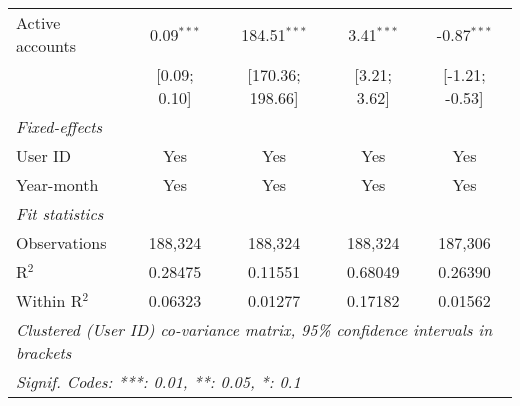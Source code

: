 \begin{table}[htbp]
\begin{threeparttable}[b]
\begin{tabular}{lcccc}
         Active accounts                   & 0.09$^{***}$             & 184.51$^{***}$       & 3.41$^{***}$             & -0.87$^{***}$\\   
                                           & [0.09; 0.10]             & [170.36; 198.66]     & [3.21; 3.62]             & [-1.21; -0.53]\\   
         \midrule
         \emph{Fixed-effects}\\
         User ID                           & Yes                      & Yes                  & Yes                      & Yes\\  
         Year-month                        & Yes                      & Yes                  & Yes                      & Yes\\  
         \midrule
         \emph{Fit statistics}\\
         Observations                      & 188,324                  & 188,324              & 188,324                  & 187,306\\  
         R$^2$                             & 0.28475                  & 0.11551              & 0.68049                  & 0.26390\\  
         Within R$^2$                      & 0.06323                  & 0.01277              & 0.17182                  & 0.01562\\  
         \midrule \midrule
         \multicolumn{5}{l}{\emph{Clustered (User ID) co-variance matrix, 95\% confidence intervals in brackets}}\\
         \multicolumn{5}{l}{\emph{Signif. Codes: ***: 0.01, **: 0.05, *: 0.1}}\\
      \end{tabular}
   \end{threeparttable}
\end{table}


